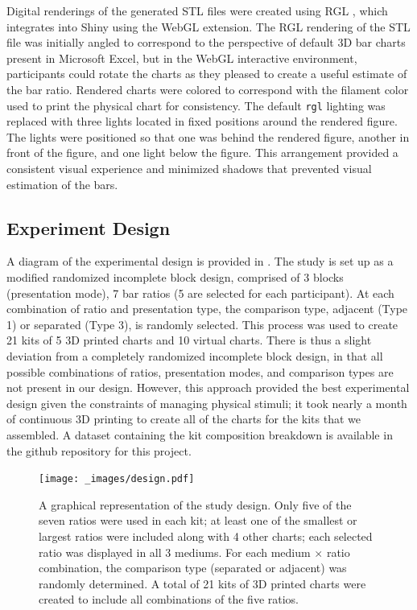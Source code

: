 \documentclass[letterpaper,inpress,dvipsnames]{jdsart}
\begin{document}
Digital renderings of the generated STL files were created using RGL \citep{rgl}, which integrates into Shiny \citep{shiny} using the WebGL \citep{mozillafoundationWebGL2D3D2023} extension.
The RGL rendering of the STL file was initially angled to correspond to the perspective of default 3D bar charts present in Microsoft Excel, but in the WebGL interactive environment, participants could rotate the charts as they pleased to create a useful estimate of the bar ratio.
Rendered charts were colored to correspond with the filament color used to print the physical chart for consistency.
The default \texttt{rgl} lighting was replaced with three lights located in fixed positions around the rendered figure.
The lights were positioned so that one was behind the rendered figure, another in front of the figure, and one light below the figure.
This arrangement provided a consistent visual experience and minimized shadows that prevented visual estimation of the bars.

\hypertarget{experiment-design}{%
\subsection{Experiment Design}\label{experiment-design}}

A diagram of the experimental design is provided in . The study is set up as a modified randomized incomplete block design, comprised of 3 blocks (presentation mode), 7 bar ratios (5 are selected for each participant). At each combination of ratio and presentation type, the comparison type, adjacent (Type 1) or separated (Type 3), is randomly selected. This process was used to create 21 kits of 5 3D printed charts and 10 virtual charts. There is thus a slight deviation from a completely randomized incomplete block design, in that all possible combinations of ratios, presentation modes, and comparison types are not present in our design. However, this approach provided the best experimental design given the constraints of managing physical stimuli; it took nearly a month of continuous 3D printing to create all of the charts for the kits that we assembled. A dataset containing the kit composition breakdown is available in the github repository for this project.

\begin{figure}
\centering
\texttt{[image: \_images/design.pdf]}
\caption{\label{fig:studyDesign}A graphical representation of the study design. Only five of the seven ratios were used in each kit; at least one of the smallest or largest ratios were included along with 4 other charts; each selected ratio was displayed in all 3 mediums. For each medium \(\times\) ratio combination, the comparison type (separated or adjacent) was randomly determined. A total of 21 kits of 3D printed charts were created to include all combinations of the five ratios.}
\end{figure}
\end{document}
